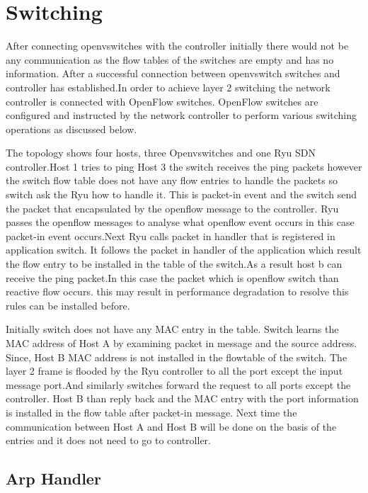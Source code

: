 \section {Switching}


After connecting openvswitches with the controller initially there would not be any communication as the flow tables of the switches are empty and has no information. After a successful connection between openvswitch switches and controller has established.In order to achieve layer 2 switching the network controller is connected with OpenFlow switches. OpenFlow switches are configured and instructed by the network controller to perform various switching operations as discussed below.

The topology shows four hosts, three Openvswitches and one Ryu SDN controller.Host 1 tries to ping Host 3 the switch receives the ping packets however the switch flow table does not have any flow entries to handle the packets so switch ask the Ryu how to handle it. This is packet-in event and the switch send the packet that encapsulated by the openflow message to the controller. Ryu passes the openflow messages to analyse what openflow event occurs in this case packet-in event occurs.Next Ryu calls packet in handler that is registered in application switch. It follows the packet in handler of the application which result the flow entry to be  installed in the table of the switch.As a result host b can receive the ping packet.In this case the packet which is openflow switch than reactive flow occurs. this may result in performance degradation to resolve this rules can be installed before. 

Initially switch does not have any MAC entry in the table. Switch learns the MAC address of Host A by examining packet in message and the source address. Since, Host B MAC address is not installed in the flowtable of the switch. The layer 2 frame is flooded by the Ryu controller to all the port except the input message port.And similarly switches forward the request to all ports except the controller. Host B than reply back and the MAC entry with the port information is installed in the flow table after packet-in message. Next time the communication between Host A and Host B will be done on the basis of the entries and it does not need to go to controller.


\subsection {Arp Handler }

